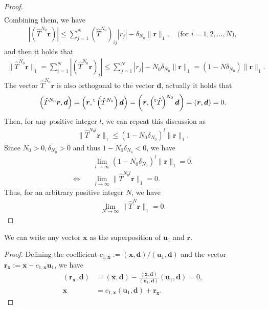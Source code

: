 \begin{proof}
\begin{align}
	\end{align}
	Combining them, we have
	\begin{align}
	|\left(\hat{T}^{N_{0}}\bm{r}\right)| \leq \sum_{j=1}^{N}\left(\hat{T}^{N_{0}}\right)_{ij}|r_{j}| - \delta_{N_{0}}\|\bm{r}\|_{1},\quad\text{(for $i=1,2,\dots,N$)},
	\end{align}
	and then it holds that
	\begin{align}
	\|\hat{T}^{N_{0}}\bm{r}\|_{1} = \sum_{i=1}^{N}|\left(\hat{T}^{N_{0}}\bm{r}\right)_{i}| \leq \sum_{j=1}^{N}|r_{j}| - N_{0}\delta_{N_{0}}\|\bm{r}\|_{1} = (1-N\delta_{N_{0}})\|\bm{r}\|_{1}.
	\end{align}
	The vector $\hat{T}^{N_{0}}\bm{r}$ is also orthogonal to the vector $\bm{d}$, actually it holds that
	\begin{align}
	\left(\hat{T}^{N_{0}}\bm{r},\bm{d}\right) = \left(\bm{r},{}^{\rm t}\left(\hat{T}^{N_{0}}\right)\bm{d}\right) = \left(\bm{r},\left({}^{\rm t}\hat{T}\right)^{N_{0}}\bm{d}\right) = \left(\bm{r},\bm{d}\right) = 0.
	\end{align}
	Then, for any positive integer $l$, we can repeat this discussion as
	\begin{align}
	\|\hat{T}^{N_{0}l}\bm{r}\|_{1} \leq (1-N_{0}\delta_{N_{0}})^{l}\|\bm{r}\|_{1}.
	\end{align}
	Since $N_{0}>0, \delta_{N_{0}}>0$ and thus $1-N_{0}\delta_{N_{0}} < 0$, we have
	\begin{align}
	&\lim_{l\to\infty}(1-N_{0}\delta_{N_{0}})^{l}\|\bm{r}\|_{1} = 0.\\
	\Longleftrightarrow\quad&\lim_{l\to\infty}\|\hat{T}^{N_{0}l}\bm{r}\|_{1} = 0.
	\end{align}
	Thus, for an arbitrary positive integer $N$, we have
	\begin{align}
	\lim_{N\to\infty}\|\hat{T}^{N}\bm{r}\|_{1} = 0.
	\end{align}
\end{proof}

\begin{theorem}\label{theo:SupPos}
	We can write any vector $\bm{x}$ as the superposition of $\bm{u}_{1}$ and $\bm{r}$.
\end{theorem}

\begin{proof}
	Defining the coefficient $c_{1,\bm{x}}:=(\bm{x},\bm{d})/(\bm{u}_{1},\bm{d})$ and the vector $\bm{r}_{\bm{x}}:=\bm{x} - c_{1,\bm{x}}\bm{u}_{1}$, we have
	\begin{align}
	(\bm{r}_{\bm{x}},\bm{d}) &= (\bm{x},\bm{d}) - \frac{(\bm{x},\bm{d})}{(\bm{u}_{1},\bm{d})}(\bm{u}_{1},\bm{d}) = 0,\\
	\bm{x} &= c_{1,\bm{x}}(\bm{u}_{1},\bm{d}) + \bm{r}_{\bm{x}}.
	\end{align}
\end{proof}

